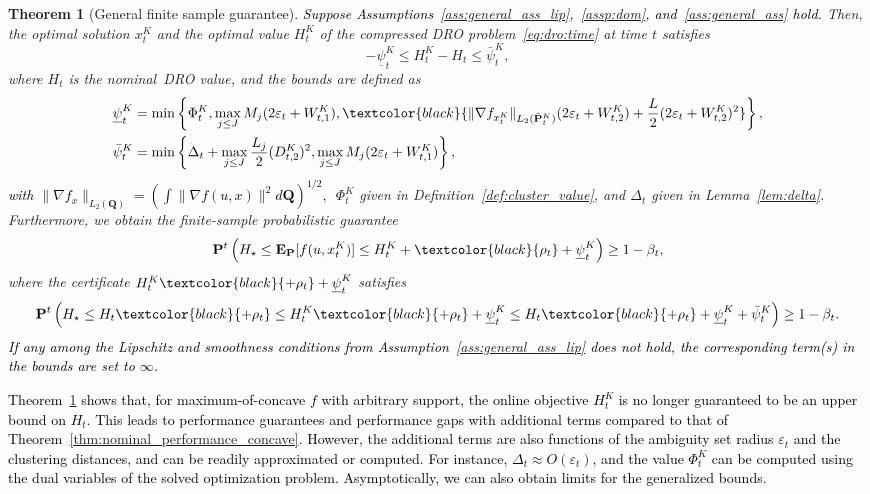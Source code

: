 \documentclass[12pt]{article}
\newcommand{\prob}{{\mathbf P}}
\newcommand{\unc}{u}
\newcommand{\epsnom}{\varepsilon}
\newcommand{\ld}{W}
\newtheorem{theorem}{Theorem}[section]  %
\newcommand{\RC}[1]{\textcolor{black}{#1}}
\newcommand{\RC}[1]{\textcolor{blue}{#1}}
\begin{document}
\begin{theorem}[General finite sample guarantee] 
\label{thm:nominal_performance}
\RC{Suppose Assumptions~\ref{ass:general_ass_lip},~\ref{assp:dom}, and~\ref{ass:general_ass} hold.} Then, the optimal solution $x^K_t$ and the optimal value $H^K_t$ of the compressed \gls{DRO} problem~\eqref{eq:dro:time} at time $t$ satisfies
\begin{equation}
\label{eq:relate}
-\underline{\psi}_t^K \le H_t^K - H_t \le \bar{\psi}_t^K,
\end{equation}
where $H_t$ is the nominal~\gls{DRO} value, and the bounds are defined as 
\begin{equation*}
    \begin{aligned}
\underline{\psi}_t^K &= \min\left\{\Phi^K_{t}, \max_{j\leq J}M_j(2\epsnom_{t}+\ld^K_{t,1}), \RC{\|\nabla f_{x^K_t}\|_{L_2(\hat{\prob}^K_t)}(2\epsnom_t + \ld^K_{t,2}) + \frac{L}{2}(2\epsnom_t + \ld^K_{t,2})^2}\right\},\\
\bar{\psi}_t^K &= \min\left\{ \Delta_t +{\max_{j \leq J}\frac{L_j}{2}}(D^K_{t,2})^2,  \max_{j\leq J}M_j(2\epsnom_{t} + \ld^K_{t,1})\right\},
    \end{aligned}
\end{equation*}
\RC{with $\|\nabla f_x\|_{L_2(\mathbf{Q})} = (\int \|\nabla f(u,x)\|^2d\mathbf{Q})^{1/2},$}~$\Phi^K_t$ given in Definition~\ref{def:cluster_value},
and $\Delta_t$ given in Lemma~\ref{lem:delta}.
Furthermore, we obtain the finite-sample probabilistic guarantee
\begin{equation}
\label{eq:oos_bounds}
\prob^{{t}}\left(H_\star \leq \mathbf{E}_{\mathbf{P}}[f(\unc, x^K_{t})] \leq H^K_t + \RC{\rho_{t}} +\underline{\psi}_t^K \right) \geq 1 - \beta_{t},
\end{equation}
where the certificate $H^K_t\RC{ +\rho_{t}} + \underline{\psi}_t^K$ satisfies
\begin{equation}
\label{eq:is_bounds}
\prob^{{t}}\left( H_\star \leq H_{t} \RC{+\rho_{t}}\leq  H^K_t \RC{ + \rho_{t}}+ \underline{\psi}_t^K \leq H_{t}\RC{ + \rho_{t}}+\underline{\psi}_t^K+\bar{\psi}_t^K \right) \geq 1 - \beta_{t}.
\end{equation}
\RC{If any among the Lipschitz and smoothness conditions from Assumption~\ref{ass:general_ass_lip} does not hold, the corresponding term(s) in the bounds are set to $\infty$.}  
\end{theorem}

\RC{Theorem~\ref{thm:nominal_performance} shows that, for maximum-of-concave $f$ with arbitrary support, the online objective $H^K_t$ is no longer guaranteed to be an upper bound on $H_t$. This leads to performance guarantees and performance gaps with additional terms compared to that of Theorem~\ref{thm:nominal_performance_concave}. However, the additional terms are also functions of the ambiguity set radius $\epsnom_t$ and
the clustering distances, and can be readily approximated or computed. For instance, $\Delta_t \approx O(\epsnom_{t})$, and the value $\Phi^K_t$ can be computed using the dual variables of the solved optimization problem. Asymptotically, we can also obtain limits for the generalized bounds.} 
\end{document}
